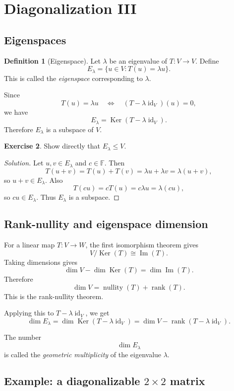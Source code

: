 \documentclass[11pt]{article}
\newcommand{\F}{\mathbb F}
\newcommand{\id}{\operatorname{id}}
\newcommand{\rank}{\operatorname{rank}}
\newcommand{\Ker}{\operatorname{Ker}}
\newcommand{\Imop}{\operatorname{Im}}
\newcommand{\nullity}{\operatorname{nullity}}
\theoremstyle{definition}
\newtheorem{definition}{Definition}[section]
\newtheorem{exercise}[definition]{Exercise}
\theoremstyle{plain}
\begin{document}
\section{Diagonalization III}

\subsection{Eigenspaces}

\begin{definition}[Eigenspace]
Let $\lambda$ be an eigenvalue of $T:V\to V$.  Define
\[
E_{\lambda}=\{u\in V:T(u)=\lambda u\}.
\]
This is called the \emph{eigenspace} corresponding to $\lambda$.
\end{definition}

Since
\[
T(u)=\lambda u
\quad\Longleftrightarrow\quad
(T-\lambda\id_V)(u)=0,
\]
we have
\[
E_{\lambda}=\Ker(T-\lambda\id_V).
\]
Therefore $E_{\lambda}$ is a subspace of $V$.

\begin{exercise}
Show directly that $E_{\lambda}\leq V$.
\end{exercise}

\begin{proof}[Solution]
Let $u,v\in E_{\lambda}$ and $c\in\F$.  Then
\[
T(u+v)=T(u)+T(v)=\lambda u+\lambda v=\lambda(u+v),
\]
so $u+v\in E_{\lambda}$.  Also
\[
T(cu)=cT(u)=c\lambda u=\lambda(cu),
\]
so $cu\in E_{\lambda}$.  Thus $E_{\lambda}$ is a subspace.
\end{proof}

\subsection{Rank-nullity and eigenspace dimension}

For a linear map $T:V\to W$, the first isomorphism theorem gives
\[
V/\Ker(T)\cong \Imop(T).
\]
Taking dimensions gives
\[
\dim V-\dim\Ker(T)=\dim\Imop(T).
\]
Therefore
\[
\dim V=\nullity(T)+\rank(T).
\]
This is the rank-nullity theorem.

Applying this to $T-\lambda\id_V$, we get
\[
\dim E_{\lambda}
=\dim\Ker(T-\lambda\id_V)
=\dim V-\rank(T-\lambda\id_V).
\]

The number
\[
\dim E_{\lambda}
\]
is called the \emph{geometric multiplicity} of the eigenvalue $\lambda$.

\subsection{Example: a diagonalizable $2\times2$ matrix}
\end{document}
